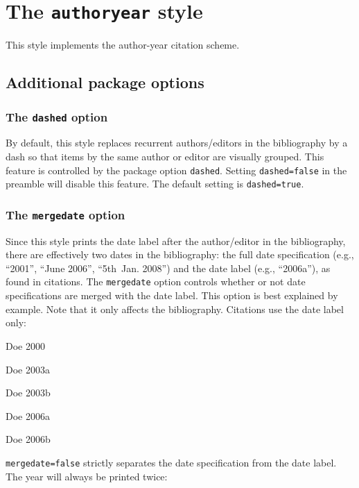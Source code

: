\documentclass[a4paper]{article}
\newenvironment{bibsample}
  {\trivlist\samepage
   \setlength{\itemsep}{0pt}}
  {\endtrivlist}
\begin{document}
\section*{The \texttt{authoryear} style}

This style implements the author-year citation scheme.

\subsection*{Additional package options}

\subsubsection*{The \texttt{dashed} option}

By default, this style replaces recurrent authors/editors in the
bibliography by a dash so that items by the same author or editor
are visually grouped. This feature is controlled by the package
option \texttt{dashed}. Setting \texttt{dashed=false} in the
preamble will disable this feature. The default setting is
\texttt{dashed=true}.

\subsubsection*{The \texttt{mergedate} option}

Since this style prints the date label after the author/editor in the
bibliography, there are effectively two dates in the bibliography:
the full date specification (e.g., \enquote{2001}, \enquote{June
2006}, \enquote{5th~Jan. 2008}) and the date label (e.g.,
\enquote{2006a}), as found in citations. The \texttt{mergedate}
option controls whether or not date specifications are merged with
the date label. This option is best explained by example. Note that
it only affects the bibliography. Citations use the date label only:

\begin{bibsample}
\item Doe 2000
\item Doe 2003a
\item Doe 2003b
\item Doe 2006a
\item Doe 2006b
\end{bibsample}

\texttt{mergedate=false} strictly separates the date specification
from the date label. The year will always be printed twice:
\end{document}

